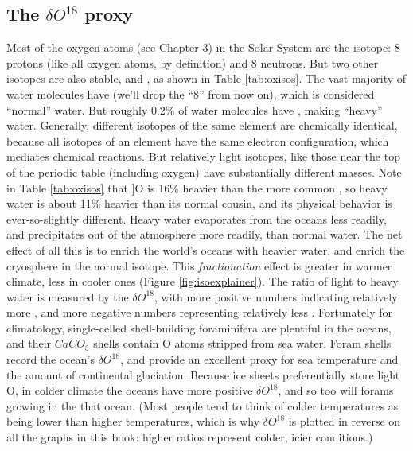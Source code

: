 \subsection{The $\delta O^{18}$ proxy}
Most of the oxygen atoms (see Chapter 3) in the Solar System are the  isotope: 8 protons (like all oxygen atoms, by definition) and 8 neutrons. But two other isotopes are also stable,  and , as shown in Table \ref{tab:oxisos}. The vast majority of water molecules have (we'll drop the ``8'' from now on), which is considered ``normal'' water. But roughly 0.2\% of water molecules have , making ``heavy'' water. Generally, different isotopes of the same element are chemically identical, because all isotopes of an element have the same electron configuration, which mediates chemical reactions. But relatively light isotopes, like those near the top of the periodic table (including oxygen) have substantially different masses. Note in Table \ref{tab:oxisos} that \isotope[18]]{O} is 16\% heavier than the more common , so heavy water is about 11\% heavier than its normal cousin, and its physical behavior is ever-so-slightly different. Heavy water evaporates from the oceans less readily, and precipitates out of the atmosphere more readily, than normal water. The net effect of all this is to enrich the world's oceans with heavier water, and enrich the cryosphere in the normal isotope. This \emph{fractionation} effect is greater in warmer climate, less in cooler ones (Figure \ref{fig:isoexplainer}). The ratio of light to heavy water is measured by the $\delta O^{18}$, with more positive numbers indicating relatively more , and more negative numbers representing relatively less . Fortunately for climatology, single-celled shell-building foraminifera are plentiful in the oceans, and their $CaCO_3$ shells contain O atoms stripped from sea water. Foram shells record the ocean's $\delta O^{18}$, and provide an excellent proxy for sea temperature and the amount of continental glaciation. Because ice sheets preferentially store light O, in colder climate the oceans have more positive $\delta O^{18}$, and so too will forams growing in the that ocean. (Most people tend to think of colder temperatures as being lower than higher temperatures, which is why $\delta O^{18}$ is plotted in reverse on all the graphs in this book: higher ratios represent colder, icier conditions.)

